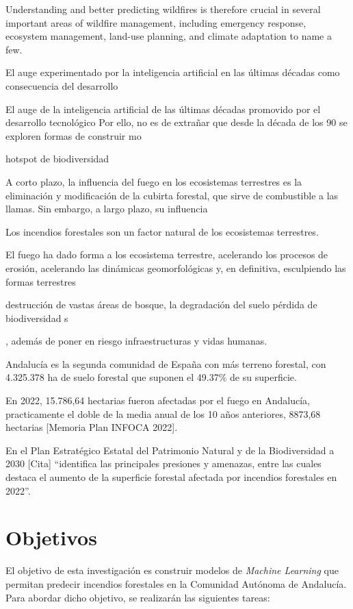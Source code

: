 \documentclass[12pt,a4paper,]{book}
\numberwithin{dummy}{section}
\theoremstyle{ocrenumbox}
\theoremstyle{blacknumex}
\theoremstyle{blacknumbox}
\theoremstyle{ocrenum}
\theoremstyle{ocrenum}
\begin{document}
Understanding and better predicting wildfires is therefore crucial in
several important areas of wildfire management, including emergency
response, ecosystem management, land-use planning, and climate
adaptation to name a few.

El auge experimentado por la inteligencia artificial en las últimas
décadas como consecuencia del desarrollo

El auge de la inteligencia artificial de las últimas décadas promovido
por el desarrollo tecnológico Por ello, no es de extrañar que desde la
década de los 90 se exploren formas de construir mo

hotspot de biodiversidad

A corto plazo, la influencia del fuego en los ecosistemas terrestres es
la eliminación y modificación de la cubirta forestal, que sirve de
combustible a las llamas. Sin embargo, a largo plazo, su influencia

Los incendios forestales son un factor natural de los ecosistemas
terrestres.

El fuego ha dado forma a los ecosistema terrestre, acelerando los
procesos de erosión, acelerando las dinámicas geomorfológicas y, en
definitiva, esculpiendo las formas terrestres

destrucción de vastas áreas de bosque, la degradación del suelo pérdida
de biodiversidad s

, además de poner en riesgo infraestructuras y vidas humanas.

Andalucía es la segunda comunidad de España con más terreno forestal,
con 4.325.378 ha de suelo forestal que suponen el 49.37\% de su
superficie.

En 2022, 15.786,64 hectarias fueron afectadas por el fuego en Andalucía,
practicamente el doble de la media anual de los 10 años anteriores,
8873,68 hectarias {[}Memoria Plan INFOCA 2022{]}.

En el Plan Estratégico Estatal del Patrimonio Natural y de la
Biodiversidad a 2030 {[}Cita{]} ``identifica las principales presiones y
amenazas, entre las cuales destaca el aumento de la superficie forestal
afectada por incendios forestales en 2022''.

\hypertarget{objetivos}{%
\section{Objetivos}\label{objetivos}}

El objetivo de esta investigación es construir modelos de \emph{Machine
Learning} que permitan predecir incendios forestales en la Comunidad
Autónoma de Andalucía. Para abordar dicho objetivo, se realizarán las
siguientes tareas:
\end{document}

